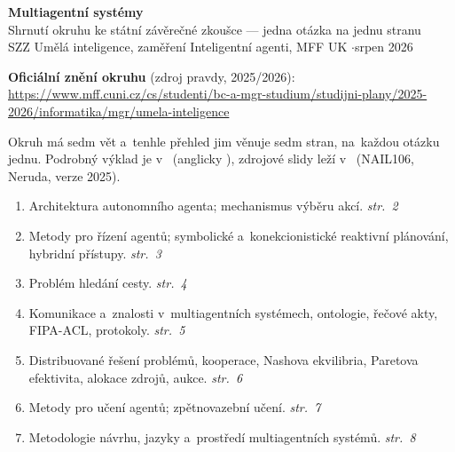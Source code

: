 \documentclass[10pt,a4paper]{article}
\begin{document}
\raggedcolumns   %

\thispagestyle{empty}
\begin{center}
{\LARGE\bfseries Multiagentní systémy}\\[0.35em]
{\large Shrnutí okruhu ke státní závěrečné zkoušce --- jedna otázka na jednu stranu}\\[0.5em]
{\small SZZ Umělá inteligence, zaměření Inteligentní agenti, MFF UK \quad$\cdot$\quad srpen 2026}
\end{center}

\begin{qbox}{}
\small\raggedright
\textbf{Oficiální znění okruhu} (zdroj pravdy, 2025/2026):
{\footnotesize\url{https://www.mff.cuni.cz/cs/studenti/bc-a-mgr-studium/studijni-plany/2025-2026/informatika/mgr/umela-inteligence}}
\end{qbox}

\small
Okruh má sedm vět a~tenhle přehled jim věnuje sedm stran, na~každou otázku jednu. Podrobný
výklad je v~ (anglicky ),
zdrojové slidy leží v~ (NAIL106, Neruda, verze 2025).

\begin{enumerate}[leftmargin=2em,itemsep=1pt]
\item Architektura autonomního agenta; mechanismus výběru akcí. \hfill \textit{str.~2}
\item Metody pro řízení agentů; symbolické a~konekcionistické reaktivní plánování, hybridní
  přístupy. \hfill \textit{str.~3}
\item Problém hledání cesty. \hfill \textit{str.~4}
\item Komunikace a~znalosti v~multiagentních systémech, ontologie, řečové akty, FIPA-ACL,
  protokoly. \hfill \textit{str.~5}
\item Distribuované řešení problémů, kooperace, Nashova ekvilibria, Paretova efektivita,
  alokace zdrojů, aukce. \hfill \textit{str.~6}
\item Metody pro učení agentů; zpětnovazební učení. \hfill \textit{str.~7}
\item Metodologie návrhu, jazyky a~prostředí multiagentních systémů. \hfill \textit{str.~8}
\end{enumerate}
\end{document}
